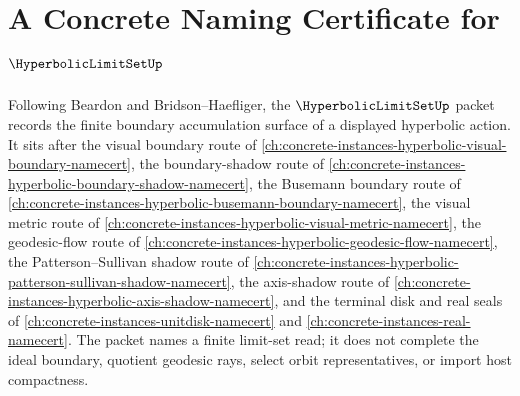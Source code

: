 \chapter{A Concrete Naming Certificate for $\HyperbolicLimitSetUp$}
\label{ch:concrete-instances-hyperbolic-limit-set-namecert}

Following Beardon and Bridson--Haefliger, the $\HyperbolicLimitSetUp$ packet records the finite boundary accumulation surface of a displayed hyperbolic action. It sits after the visual boundary route of \autoref{ch:concrete-instances-hyperbolic-visual-boundary-namecert}, the boundary-shadow route of \autoref{ch:concrete-instances-hyperbolic-boundary-shadow-namecert}, the Busemann boundary route of \autoref{ch:concrete-instances-hyperbolic-busemann-boundary-namecert}, the visual metric route of \autoref{ch:concrete-instances-hyperbolic-visual-metric-namecert}, the geodesic-flow route of \autoref{ch:concrete-instances-hyperbolic-geodesic-flow-namecert}, the Patterson--Sullivan shadow route of \autoref{ch:concrete-instances-hyperbolic-patterson-sullivan-shadow-namecert}, the axis-shadow route of \autoref{ch:concrete-instances-hyperbolic-axis-shadow-namecert}, and the terminal disk and real seals of \autoref{ch:concrete-instances-unitdisk-namecert} and \autoref{ch:concrete-instances-real-namecert}. The packet names a finite limit-set read; it does not complete the ideal boundary, quotient geodesic rays, select orbit representatives, or import host compactness.

